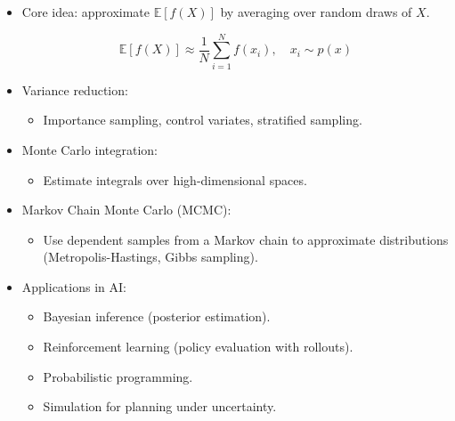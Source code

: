 \documentclass[
  letterpaper,
  DIV=11,
  numbers=noendperiod]{scrreprt}
\providecommand{\tightlist}{%
  \setlength{\itemsep}{0pt}\setlength{\parskip}{0pt}}
\begin{document}
\begin{itemize}
\item
  Core idea: approximate \(\mathbb{E}[f(X)]\) by averaging over random
  draws of \(X\).

  \[
  \mathbb{E}[f(X)] \approx \frac{1}{N}\sum_{i=1}^N f(x_i), \quad x_i \sim p(x)
  \]
\item
  Variance reduction:

  \begin{itemize}
  \tightlist
  \item
    Importance sampling, control variates, stratified sampling.
  \end{itemize}
\item
  Monte Carlo integration:

  \begin{itemize}
  \tightlist
  \item
    Estimate integrals over high-dimensional spaces.
  \end{itemize}
\item
  Markov Chain Monte Carlo (MCMC):

  \begin{itemize}
  \tightlist
  \item
    Use dependent samples from a Markov chain to approximate
    distributions (Metropolis-Hastings, Gibbs sampling).
  \end{itemize}
\item
  Applications in AI:

  \begin{itemize}
  \tightlist
  \item
    Bayesian inference (posterior estimation).
  \item
    Reinforcement learning (policy evaluation with rollouts).
  \item
    Probabilistic programming.
  \item
    Simulation for planning under uncertainty.
  \end{itemize}
\end{itemize}
\end{document}
